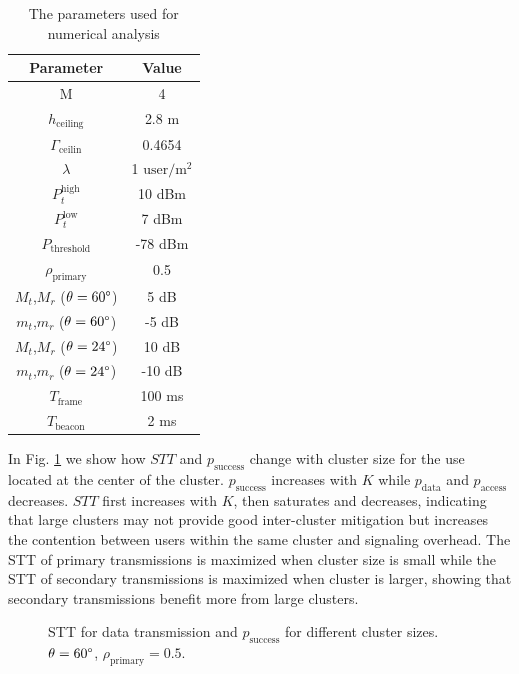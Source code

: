 \documentclass[10pt, conference, letterpaper]{IEEEtran}
\begin{document}
\begin{table}
	\centering
	\caption{The parameters used for numerical analysis}
	\begin{tabular}{cc}
		\hline
		Parameter & Value \\
		\hline
		M & 4 \\
		$h_{\mathrm{ceiling}}$ & 2.8 m \\
		$\Gamma_{\mathrm{ceilin}}$ & 0.4654 \\
		$\lambda$ & 1 $\mathrm{user/m^2}$ \\
		$P_t^{\mathrm{high}}$ & 10 dBm \\
		$P_t^{\mathrm{low}}$ & 7 dBm \\
		$P_{\mathrm{threshold}}$ & -78 dBm \\
		$\rho_{\mathrm{primary}}$ & 0.5 \\
		$M_t$,$M_r$ ($\theta = 60\degree$) & 5 dB \\
		$m_t$,$m_r$ ($\theta = 60\degree$) & -5 dB \\
		$M_t$,$M_r$ ($\theta = 24\degree$) & 10 dB \\
		$m_t$,$m_r$ ($\theta = 24\degree$) & -10 dB \\		
		$T_{\mathrm{frame}}$ & 100 ms \\
		$T_{\mathrm{beacon}}$ & 2 ms \\
		\hline
	\end{tabular}
	\label{tab:clusteranalysis:parameter}	
\end{table}

In Fig. \ref{fig:clusteranalysis:basic} we show how $STT$ and $p_{\mathrm{success}}$ change with cluster size for the use located at the center of the cluster.  $p_{\mathrm{success}}$ increases with $K$ while $p_{\mathrm{data}}$ and $p_{\mathrm{access}}$ decreases. $STT$ first increases with $K$, then saturates and decreases, indicating that large clusters may not provide good inter-cluster mitigation but increases the contention between users within the same cluster and signaling overhead. The STT of primary transmissions is maximized when cluster size is small while the STT of secondary transmissions is maximized when cluster is larger, showing that secondary transmissions benefit more from large clusters.  

\begin{figure}[htp]
	\centering
	
	
	\caption[]{STT for data transmission  and $p_{\mathrm{success}}$  for different cluster sizes. $\theta=60\degree$, $\rho_{\mathrm{primary}} = 0.5$. }
	\label{fig:clusteranalysis:basic}
\end{figure}
\end{document}
